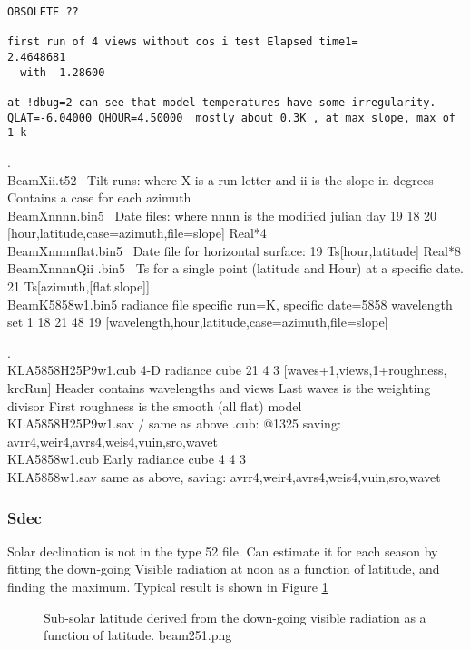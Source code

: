 \documentclass{article}
\begin{document}
\begin{verbatim}
OBSOLETE ??

first run of 4 views without cos i test Elapsed time1=        2.4648681
  with  1.28600

at !dbug=2 can see that model temperatures have some irregularity.
QLAT=-6.04000 QHOUR=4.50000  mostly about 0.3K , at max slope, max of 1 k
\end{verbatim}

.
\\ BeamXii.t52 \ Tilt runs: where X is a run letter and ii is the slope in degrees
\qi Contains a case for each azimuth
\\ BeamXnnnn.bin5 \ Date files: where nnnn is the modified julian day
 19 18 20  [hour,latitude,case=azimuth,file=slope]  Real*4
\\ BeamXnnnnflat.bin5  \ Date file for horizontal surface:
 19 Ts[hour,latitude]   Real*8
\\ BeamXnnnnQii .bin5  \ Ts for a single point (latitude and Hour) at a specific date.
 21 Ts[azimuth,[flat,slope]]
\\ BeamK5858w1.bin5 radiance file specific run=K, specific date=5858 wavelength set 1
 18 21 48 19 [wavelength,hour,latitude,case=azimuth,file=slope]

\vspace{2mm} .
\\ KLA5858H25P9w1.cub   4-D radiance cube
 21 4 3  [waves+1,views,1+roughness, krcRun]
\qiii Header contains wavelengths and views
\qii Last waves is the weighting divisor
\qii First roughness is the smooth (all flat) model
\\ KLA5858H25P9w1.sav  /  same as above .cub:  @1325
\qi saving:  avrr4,weir4,avrs4,weis4,vuin,sro,wavet
\\ KLA5858w1.cub   Early radiance cube
 4 4 3
\\ KLA5858w1.sav 
\qi same as above, saving:  avrr4,weir4,avrs4,weis4,vuin,sro,wavet

\subsubsection{Sdec}
Solar declination is not in the type 52 file. Can estimate it for each season by
fitting the down-going Visible radiation at noon as a function of latitude, and
finding the maximum. Typical result is shown in Figure \ref{beam251}
\begin{figure}[!ht] 
\caption[Estimated sub-Solar Latitude]{Sub-solar latitude derived from the
  down-going visible radiation as a function of latitude.
\label{beam251}  beam251.png }
\end{figure} 
\end{document}

